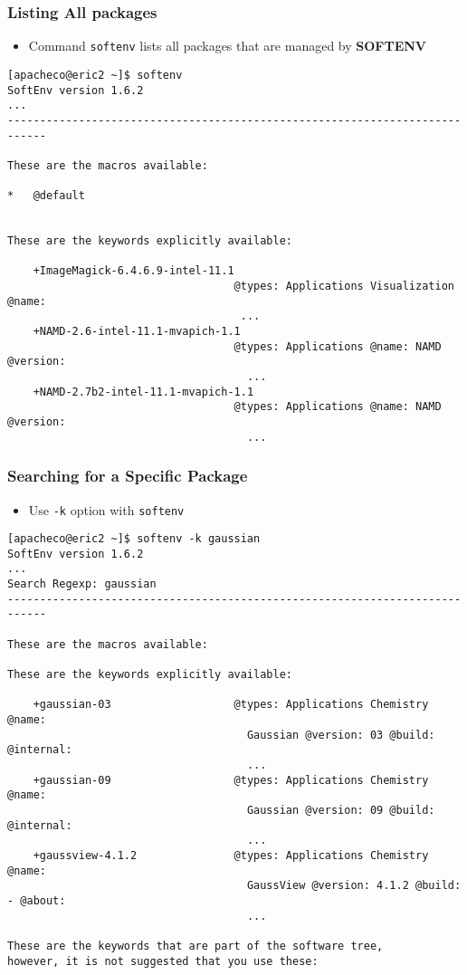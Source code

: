 \documentclass[slidestop,mathserif,compress,xcolor=svgnames,table]{beamer}
\begin{document}
\begin{frame}[fragile]
\frametitle{\small Listing All packages}
\begin{itemize}
\item Command \texttt{softenv} lists all packages that are managed by {\bf SOFTENV}
\end{itemize}
{\tiny
\begin{alertblock}{}
\begin{verbatim}
[apacheco@eric2 ~]$ softenv
SoftEnv version 1.6.2
...
----------------------------------------------------------------------------

These are the macros available:

*   @default                      


These are the keywords explicitly available:

    +ImageMagick-6.4.6.9-intel-11.1
                                   @types: Applications Visualization @name:
                                    ...
    +NAMD-2.6-intel-11.1-mvapich-1.1
                                   @types: Applications @name: NAMD @version:
                                     ...
    +NAMD-2.7b2-intel-11.1-mvapich-1.1
                                   @types: Applications @name: NAMD @version:
                                     ...
\end{verbatim}
\end{alertblock}
}
\end{frame}

\begin{frame}[fragile]
\frametitle{\small Searching for a Specific Package}
\begin{itemize}
\item Use \texttt{-k} option with \texttt{softenv}
\end{itemize}
{\tiny
\begin{alertblock}{}
\begin{verbatim}
[apacheco@eric2 ~]$ softenv -k gaussian
SoftEnv version 1.6.2
...
Search Regexp: gaussian
----------------------------------------------------------------------------

These are the macros available:

These are the keywords explicitly available:

    +gaussian-03                   @types: Applications Chemistry @name:
                                     Gaussian @version: 03 @build: @internal:
                                     ...
    +gaussian-09                   @types: Applications Chemistry @name:
                                     Gaussian @version: 09 @build: @internal:
                                     ...
    +gaussview-4.1.2               @types: Applications Chemistry @name:
                                     GaussView @version: 4.1.2 @build: - @about:
                                     ...

These are the keywords that are part of the software tree,
however, it is not suggested that you use these:
\end{verbatim}
\end{alertblock}
}
\end{frame}
\end{document}
